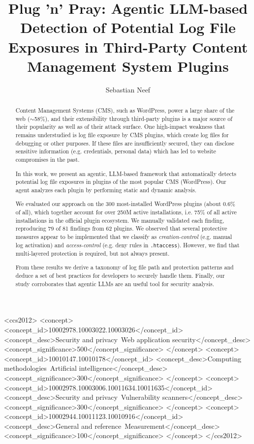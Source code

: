 \documentclass[sigconf]{acmart}
\begin{document}
\title[Plug 'n' Pray: Agentic LLM-based Detection of Potential Log File Exposures]{Plug 'n' Pray: Agentic LLM-based Detection of Potential Log File Exposures in Third-Party Content Management System Plugins}

\author{Sebastian Neef}
\renewcommand{\shortauthors}{S. Neef}

\begin{abstract}
Content Management Systems (CMS), such as WordPress, power a large share of the web ($\sim$58\%), and their extensibility through third-party plugins is a major source of their popularity as well as of their attack surface.
One high-impact weakness that remains understudied is log file exposure by CMS plugins, which create log files for debugging or other purposes. If these files are insufficiently secured, they can disclose sensitive information (e.g. credentials, personal data) which has led to website compromises in the past.

In this work, we present an agentic, LLM-based framework that automatically detects potential log file exposures in plugins of the most popular CMS (WordPress). Our agent analyzes each plugin by performing static and dynamic analysis. 

We evaluated our approach on the 300 most-installed WordPress plugins (about 0.6\% of all), which together account for over 250M active installations, i.e. 75\% of all active installations in the official plugin ecosystem. We manually validated each finding, reproducing 79 of 81 findings from 62 plugins.
We observed that several protective measures appear to be implemented that we classify as \emph{creation-control} (e.g. manual log activation) and \emph{access-control} (e.g. deny rules in \texttt{.htaccess}). However, we find that multi-layered protection is required, but not always present. 

From these results we derive a taxonomy of log file path and protection patterns and deduce a set of best practices for developers to securely handle them. Finally, our study corroborates that agentic LLMs are an useful tool for security analysis.
\end{abstract}

\begin{CCSXML}
<ccs2012>
<concept>
<concept_id>10002978.10003022.10003026</concept_id>
<concept_desc>Security and privacy~Web application security</concept_desc>
<concept_significance>500</concept_significance>
</concept>
<concept>
<concept_id>10010147.10010178</concept_id>
<concept_desc>Computing methodologies~Artificial intelligence</concept_desc>
<concept_significance>300</concept_significance>
</concept>
<concept>
<concept_id>10002978.10003006.10011634.10011635</concept_id>
<concept_desc>Security and privacy~Vulnerability scanners</concept_desc>
<concept_significance>300</concept_significance>
</concept>
<concept>
<concept_id>10002944.10011123.10010916</concept_id>
<concept_desc>General and reference~Measurement</concept_desc>
<concept_significance>100</concept_significance>
</concept>
</ccs2012>
\end{CCSXML}
\end{document}

